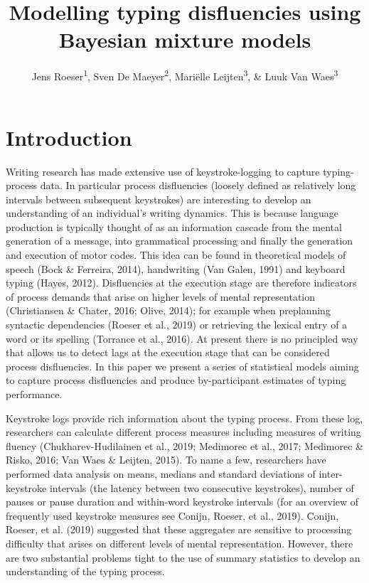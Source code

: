 \documentclass[
  english,
  man,mask,floatsintext]{apa7}
\author{Jens Roeser\textsuperscript{1}, Sven De Maeyer\textsuperscript{2}, Mariëlle Leijten\textsuperscript{3}, \& Luuk Van Waes\textsuperscript{3}}
\affiliation{
\vspace{0.5cm}
\textsuperscript{1} Department of Psychology, Nottingham Trent University, United Kingdom\\\textsuperscript{2} Faculty of Social Sciences, University of Antwerp, Belgium\\\textsuperscript{3} Department of Management, University of Antwerp, Belgium}
\title{Modelling typing disfluencies using Bayesian mixture models}
\date{}
\begin{document}
\maketitle

\hypertarget{introduction}{%
\section{Introduction}\label{introduction}}

Writing research has made extensive use of keystroke-logging to capture typing-process data. In particular process disfluencies (loosely defined as relatively long intervals between subsequent keystrokes) are interesting to develop an understanding of an individual's writing dynamics. This is because language production is typically thought of as an information cascade from the mental generation of a message, into grammatical processing and finally the generation and execution of motor codes. This idea can be found in theoretical models of speech (Bock \& Ferreira, 2014), handwriting (Van Galen, 1991) and keyboard typing (Hayes, 2012). Disfluencies at the execution stage are therefore indicators of process demands that arise on higher levels of mental representation (Christiansen \& Chater, 2016; Olive, 2014); for example when preplanning syntactic dependencies (Roeser et al., 2019) or retrieving the lexical entry of a word or its spelling (Torrance et al., 2016). At present there is no principled way that allows us to detect lags at the execution stage that can be considered process disfluencies. In this paper we present a series of statistical models aiming to capture process disfluencies and produce by-participant estimates of typing performance.

Keystroke logs provide rich information about the typing process. From these log, researchers can calculate different process measures including measures of writing fluency (Chukharev-Hudilainen et al., 2019; Medimorec et al., 2017; Medimorec \& Risko, 2016; Van Waes \& Leijten, 2015). To name a few, researchers have performed data analysis on means, medians and standard deviations of inter-keystroke intervals (the latency between two consecutive keystrokes), number of pauses or pause duration and within-word keystroke intervals (for an overview of frequently used keystroke measures see Conijn, Roeser, et al., 2019). Conijn, Roeser, et al. (2019) suggested that these aggregates are sensitive to processing difficulty that arises on different levels of mental representation. However, there are two substantial problems tight to the use of summary statistics to develop an understanding of the typing process.
\end{document}
